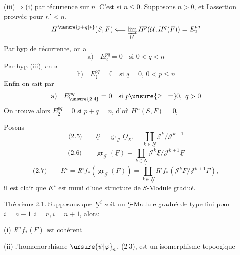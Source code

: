 (iii)$\Rightarrow$(i) par récurrence sur $n$. C'est
 si $n\leq0$. Supposons $n>0$, et l'assertion
prouvée pour $n'<n$. 
\[
H^{\unsure{p+q|\ast}}(S,F)\Longleftarrow\varinjlim_{\mathcal U}H^p(\mathcal U,H^q(F))=E_2^{pq}
\]
Par hyp de récurrence, on a
\[
\text{a)}\quad E_2^{pq}=0\quad\text{si }0<q<n
\]
Par hyp (iii), on a
\[
\text{b)}\quad E_2^{pq}=0\quad\text{si }q=0,\ 0<p\leq n
\]
Enfin on sait par 
\[
\text{a)}\quad E_{\unsure{2|4}}^{pq}=0\quad\text{si }p\unsure{\geq|=}0,\ q>0
\]
On trouve alors $E_2^{pq}=0$ si $p+q=n$, d'où
$H^n(S,F)=0$, 

Posons
\[
\text{(2.5)}\qquad\underline S=\operatorname{gr}_{\mathcal J}\underline O_{X'}
=\coprod_{k\in\underline{\underline N}}\mathcal J^k/\mathcal J^{k+1}
\]
\[
\text{(2.6)}\qquad\operatorname{gr}_{\mathcal J}(\underline F)
=\coprod_{k\in\underline{\underline N}}\mathcal J^k\underline F/\mathcal J^{k+1}\underline F
\]
\[
\text{(2.7)}\qquad\underline K^i=R^if_*(\operatorname{gr}_{\mathcal J}(\underline F))
=\coprod_{k\in\underline{\underline N}}R^if_*(\mathcal J^k\underline F/\mathcal J^{k+1}\underline F),
\]
il est clair que $\underline K^i$ est muni d'une structure de $\underline S$-Module
gradué.

\uline{Théorème 2.1.} Supposons que $\underline K^i$ soit un $\underline S$-Module gradué
\uline{de type fini} pour $i=n-1,i=n,i=n+1$, alors:

(i) $R^nf_*(F)$ est cohérent

(ii) l'homomorphisme $\unsure{\psi|\varphi}_n$, (2.3), est un isomorphisme
topoogique

